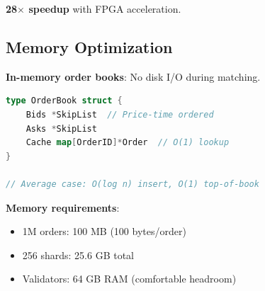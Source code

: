 \textbf{28$\times$ speedup} with FPGA acceleration.

\subsection{Memory Optimization}

\textbf{In-memory order books}: No disk I/O during matching.

\begin{lstlisting}[language=Go]
type OrderBook struct {
    Bids *SkipList  // Price-time ordered
    Asks *SkipList
    Cache map[OrderID]*Order  // O(1) lookup
}

// Average case: O(log n) insert, O(1) top-of-book
\end{lstlisting}

\textbf{Memory requirements}:
\begin{itemize}
    \item 1M orders: 100 MB (100 bytes/order)
    \item 256 shards: 25.6 GB total
    \item Validators: 64 GB RAM (comfortable headroom)
\end{itemize}

